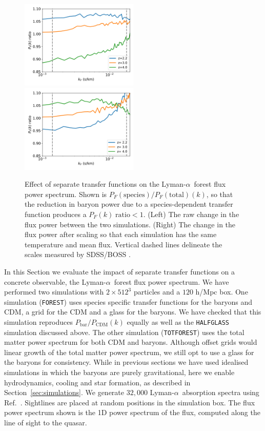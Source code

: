 \documentclass[a4paper,11pt]{article}
\newcommand{\Lya}{Lyman-$\alpha$}
\begin{document}
\begin{figure}
\includegraphics[width=0.5\textwidth]{plots/lya120_relflux_nomf.pdf}
\includegraphics[width=0.5\textwidth]{plots/lya120_relflux_mf_t0.pdf}
\caption{Effect of separate transfer functions on the \Lya~forest flux power spectrum. Shown is $P_F(\mathrm{species})/P_F(\mathrm{total})(k)$, so that the reduction in baryon power due to a species-dependent transfer function produces a $P_F(k)\; \mathrm{ratio} < 1$. (Left) The raw change in the flux power between the two simulations. (Right) The change in the flux power after scaling so that each simulation has the same temperature and mean flux. Vertical dashed lines delineate the scales measured by SDSS/BOSS \protect\cite{PD2013}.
}
\label{fig:lyaflux}
\end{figure}

In this Section we evaluate the impact of separate transfer functions on a concrete observable, the \Lya~forest flux power spectrum. We have performed two simulations with $2\times 512^3$ particles and a $120$ h/Mpc box. One simulation (\texttt{FOREST}) uses species specific transfer functions for the baryons and CDM, a grid for the CDM and a glass for the baryons. We have checked that this simulation reproduces $P_\mathrm{bar}/P_\mathrm{CDM}(k)$ equally as well as the \texttt{HALFGLASS} simulation discussed above.
The other simulation (\texttt{TOTFOREST}) uses the total matter power spectrum for both CDM and baryons.  Although offset grids would linear growth of the total matter power spectrum, we still opt to use a glass for the baryons for consistency. While in previous sections we have used idealised simulations in which the baryons are purely gravitational, here we enable hydrodynamics, cooling and star formation, as described in Section~\ref{sec:simulations}. We generate $32,000$ \Lya~absorption spectra using Ref.~\cite{FSFE}. Sightlines are placed at random positions in the simulation box. The flux power spectrum shown is the 1D power spectrum of the flux, computed along the line of sight to the quasar.
\end{document}
